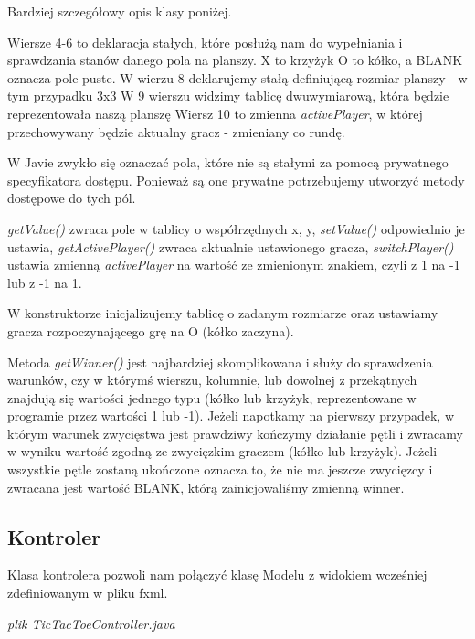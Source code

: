 \documentclass[letterpaper,10pt,english]{sphinxmanual}
\begin{document}
Bardziej szczegółowy opis klasy poniżej.

Wiersze 4-6 to deklaracja stałych, które posłużą nam do wypełniania i sprawdzania stanów danego pola na planszy. X to krzyżyk O to kółko, a BLANK oznacza pole puste.
W wierzu 8 deklarujemy stałą definiującą rozmiar planszy - w tym przypadku 3x3
W 9 wierszu  widzimy tablicę dwuwymiarową, która będzie reprezentowała naszą planszę
Wiersz 10 to zmienna \emph{activePlayer}, w której przechowywany będzie aktualny gracz - zmieniany co rundę.

W Javie zwykło się oznaczać pola, które nie są stałymi za pomocą prywatnego specyfikatora dostępu. Ponieważ są one prywatne potrzebujemy utworzyć metody dostępowe do tych pól.

\emph{getValue()} zwraca pole w tablicy o współrzędnych x, y,
\emph{setValue()} odpowiednio je ustawia,
\emph{getActivePlayer()} zwraca aktualnie ustawionego gracza,
\emph{switchPlayer()} ustawia zmienną \emph{activePlayer} na wartość ze zmienionym znakiem, czyli z 1 na -1 lub z -1 na 1.

W konstruktorze inicjalizujemy tablicę o zadanym rozmiarze oraz ustawiamy gracza rozpoczynającego grę na O (kółko zaczyna).

Metoda \emph{getWinner()} jest najbardziej skomplikowana i służy do sprawdzenia warunków, czy w którymś wierszu, kolumnie, lub dowolnej z przekątnych znajdują się wartości jednego typu (kółko lub krzyżyk, reprezentowane w programie przez wartości 1 lub -1). Jeżeli napotkamy na pierwszy przypadek, w którym warunek zwycięstwa jest prawdziwy kończymy działanie pętli i zwracamy w wyniku wartość zgodną ze zwycięzkim graczem (kółko lub krzyżyk). Jeżeli wszystkie pętle zostaną ukończone oznacza to, że nie ma jeszcze zwycięzcy i zwracana jest wartość BLANK, którą zainicjowaliśmy zmienną winner.


\subsection{Kontroler}
\label{summary:kontroler}
Klasa kontrolera pozwoli nam połączyć klasę Modelu z widokiem wcześniej zdefiniowanym w pliku fxml.

\emph{plik TicTacToeController.java}
\end{document}
